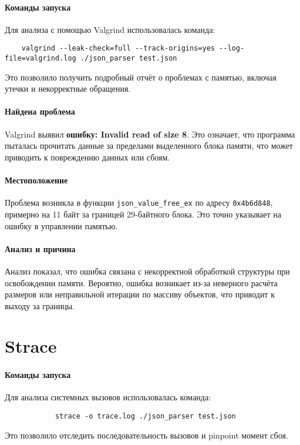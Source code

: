     \paragraph{Команды запуска} Для анализа с помощью Valgrind использовалась команда:
    \begin{verbatim}
    valgrind --leak-check=full --track-origins=yes --log-file=valgrind.log ./json_parser test.json
    \end{verbatim}
    Это позволило получить подробный отчёт о проблемах с памятью, включая утечки и некорректные обращения.

    \paragraph{Найдена проблема} Valgrind выявил \textbf{ошибку: Invalid read of size 8}.
    Это означает, что программа пыталась прочитать данные за пределами выделенного блока памяти, что может приводить к повреждению данных или сбоям.

    \paragraph{Местоположение} Проблема возникла в функции \texttt{json\_value\_free\_ex} по адресу \texttt{0x4b6d848}, примерно на 11 байт за границей 29-байтного блока.
    Это точно указывает на ошибку в управлении памятью.

    \paragraph{Анализ и причина} Анализ показал, что ошибка связана с некорректной обработкой структуры при освобождении памяти.
    Вероятно, ошибка возникает из-за неверного расчёта размеров или неправильной итерации по массиву объектов, что приводит к выходу за границы.


    \section{Strace}

    \paragraph{Команды запуска} Для анализа системных вызовов использовалась команда:
    \begin{verbatim}
            strace -o trace.log ./json_parser test.json
    \end{verbatim}
    Это позволило отследить последовательность вызовов и pinpoint момент сбоя.

